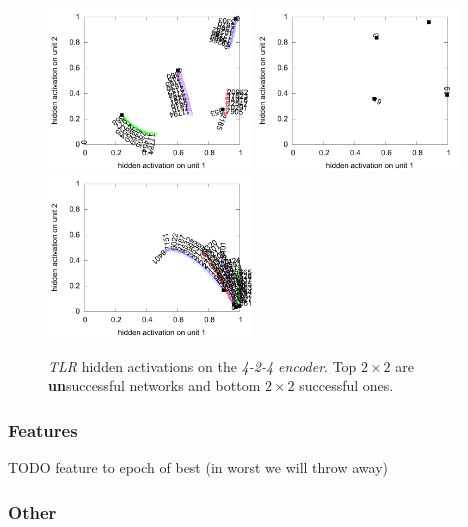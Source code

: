\begin{figure}[H]
  \includegraphics[width=0.48\textwidth]{img/hid-tlr-good-tiny.pdf}  
  \includegraphics[width=0.48\textwidth]{img/hid-tlr-good-init.pdf}  
  \includegraphics[width=0.48\textwidth]{img/hid-tlr-good-weird.pdf}  
  \caption{\emph{TLR} hidden activations on the \emph{4-2-4 encoder}. Top $2\times2$ are {\bf un}successful networks and bottom $2\times2$ successful ones.}
  \label{fig:results-hidden-activations-tlr}
\end{figure}

\subsubsection{Features}
\label{sec:results-auto4-bal-matrix-sim}

TODO feature to epoch of best (in worst we will throw away) 

\subsubsection{Other} 


